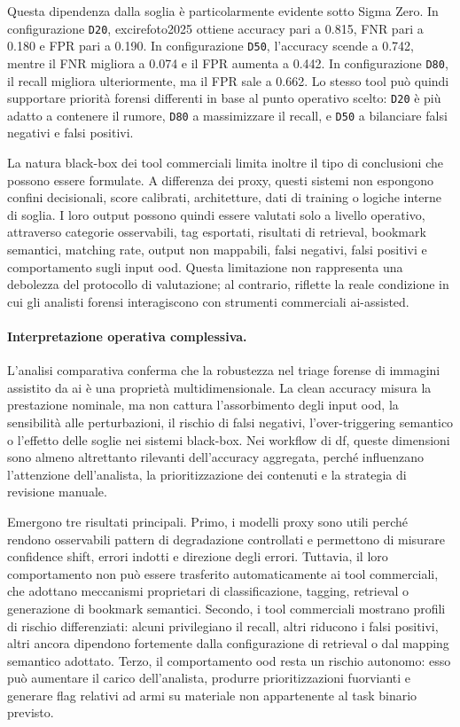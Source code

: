 Questa dipendenza dalla soglia è particolarmente evidente sotto Sigma Zero. In
configurazione \texttt{D20}, \gls{excirefoto2025} ottiene accuracy pari a 0.815,
FNR pari a 0.180 e FPR pari a 0.190. In configurazione \texttt{D50}, l'accuracy
scende a 0.742, mentre il FNR migliora a 0.074 e il FPR aumenta a 0.442. In
configurazione \texttt{D80}, il recall migliora ulteriormente, ma il FPR sale a
0.662. Lo stesso tool può quindi supportare priorità forensi differenti in base
al punto operativo scelto: \texttt{D20} è più adatto a contenere il rumore,
\texttt{D80} a massimizzare il recall, e \texttt{D50} a bilanciare falsi
negativi e falsi positivi.

La natura black-box dei tool commerciali limita inoltre il tipo di conclusioni
che possono essere formulate. A differenza dei proxy, questi sistemi non
espongono confini decisionali, score calibrati, architetture, dati di training o
logiche interne di soglia. I loro output possono quindi essere valutati solo a livello operativo, attraverso
categorie osservabili, tag esportati, risultati di retrieval, bookmark
semantici, matching rate, output non mappabili, falsi negativi, falsi positivi e
comportamento sugli input \gls{ood}. Questa limitazione non rappresenta una
debolezza del protocollo di valutazione; al contrario, riflette la reale
condizione in cui gli analisti forensi interagiscono con strumenti commerciali
\gls{ai}-assisted.

\paragraph{Interpretazione operativa complessiva.}

L'analisi comparativa conferma che la robustezza nel triage forense di immagini
assistito da \gls{ai} è una proprietà multidimensionale. La clean accuracy misura
la prestazione nominale, ma non cattura l'assorbimento degli input \gls{ood}, la
sensibilità alle perturbazioni, il rischio di falsi negativi, l'over-triggering
semantico o l'effetto delle soglie nei sistemi black-box. Nei workflow di
\gls{df}, queste dimensioni sono almeno altrettanto rilevanti dell'accuracy
aggregata, perché influenzano l'attenzione dell'analista, la prioritizzazione dei
contenuti e la strategia di revisione manuale.

Emergono tre risultati principali. Primo, i modelli proxy sono utili perché
rendono osservabili pattern di degradazione controllati e permettono di misurare
confidence shift, errori indotti e direzione degli errori. Tuttavia, il loro
comportamento non può essere trasferito automaticamente ai tool commerciali, che
adottano meccanismi proprietari di classificazione, tagging, retrieval o
generazione di bookmark semantici.
Secondo, i tool commerciali mostrano profili di rischio differenziati: alcuni
privilegiano il recall, altri riducono i falsi positivi, altri ancora dipendono
fortemente dalla configurazione di retrieval o dal mapping semantico adottato.
Terzo, il comportamento \gls{ood} resta un rischio autonomo: esso può aumentare
il carico dell'analista, produrre prioritizzazioni fuorvianti e generare flag
relativi ad armi su materiale non appartenente al task binario previsto.

